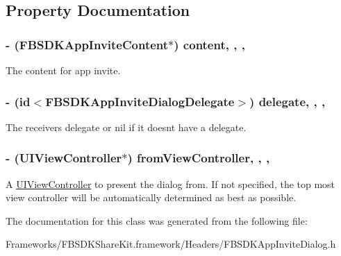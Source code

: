 \subsection{Property Documentation}
\hypertarget{interface_f_b_s_d_k_app_invite_dialog_a18b98a61c112122c1baf3a36047c9cda}{}
\subsubsection[{content}]{\setlength{\rightskip}{0pt plus 5cm}-\/ ({\bf F\+B\+S\+D\+K\+App\+Invite\+Content}$\ast$) content\hspace{0.3cm}{\ttfamily [read]}, {\ttfamily [write]}, {\ttfamily [nonatomic]}, {\ttfamily [copy]}}\label{interface_f_b_s_d_k_app_invite_dialog_a18b98a61c112122c1baf3a36047c9cda}
The content for app invite. \hypertarget{interface_f_b_s_d_k_app_invite_dialog_afd09a07b729c7263d4c3d9e5b0b62ada}{}
\subsubsection[{delegate}]{\setlength{\rightskip}{0pt plus 5cm}-\/ (id$<${\bf F\+B\+S\+D\+K\+App\+Invite\+Dialog\+Delegate}$>$) delegate\hspace{0.3cm}{\ttfamily [read]}, {\ttfamily [write]}, {\ttfamily [nonatomic]}, {\ttfamily [weak]}}\label{interface_f_b_s_d_k_app_invite_dialog_afd09a07b729c7263d4c3d9e5b0b62ada}
The receiver\textquotesingle{}s delegate or nil if it doesn\textquotesingle{}t have a delegate. \hypertarget{interface_f_b_s_d_k_app_invite_dialog_ab5b840b13afd930e3eefdbae3d54a8b0}{}
\subsubsection[{from\+View\+Controller}]{\setlength{\rightskip}{0pt plus 5cm}-\/ (U\+I\+View\+Controller$\ast$) from\+View\+Controller\hspace{0.3cm}{\ttfamily [read]}, {\ttfamily [write]}, {\ttfamily [nonatomic]}, {\ttfamily [weak]}}\label{interface_f_b_s_d_k_app_invite_dialog_ab5b840b13afd930e3eefdbae3d54a8b0}
A \hyperlink{class_u_i_view_controller-p}{U\+I\+View\+Controller} to present the dialog from.  If not specified, the top most view controller will be automatically determined as best as possible. 

The documentation for this class was generated from the following file\+:\begin{DoxyCompactItemize}
\item 
Frameworks/\+F\+B\+S\+D\+K\+Share\+Kit.\+framework/\+Headers/F\+B\+S\+D\+K\+App\+Invite\+Dialog.\+h\end{DoxyCompactItemize}
